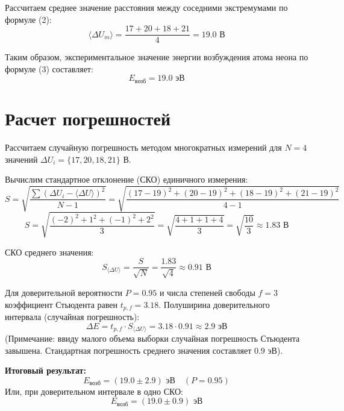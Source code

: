 \documentclass[a4paper,12pt]{article}
\begin{document}
\noindent Рассчитаем среднее значение расстояния между соседними экстремумами по формуле (2):
\begin{equation*}
\langle \Delta U_m \rangle = \frac{17 + 20 + 18 + 21}{4} = 19.0 \text{ В}
\end{equation*}

\noindent Таким образом, экспериментальное значение энергии возбуждения атома неона по формуле (3) составляет:
\begin{equation*}
E_{\text{возб}} = 19.0 \text{ эВ}
\end{equation*}

\section{Расчет погрешностей}

Рассчитаем случайную погрешность методом многократных измерений для $N = 4$ значений $\Delta U_i = \{17, 20, 18, 21\}$ В.

\noindent Вычислим стандартное отклонение (СКО) единичного измерения:
\begin{equation*}
S = \sqrt{\frac{\sum (\Delta U_i - \langle \Delta U \rangle)^2}{N-1}} = \sqrt{\frac{(17-19)^2 + (20-19)^2 + (18-19)^2 + (21-19)^2}{4-1}}
\end{equation*}
\begin{equation*}
S = \sqrt{\frac{(-2)^2 + 1^2 + (-1)^2 + 2^2}{3}} = \sqrt{\frac{4 + 1 + 1 + 4}{3}} = \sqrt{\frac{10}{3}} \approx 1.83 \text{ В}
\end{equation*}

\noindent СКО среднего значения:
\begin{equation*}
S_{\langle \Delta U \rangle} = \frac{S}{\sqrt{N}} = \frac{1.83}{\sqrt{4}} \approx 0.91 \text{ В}
\end{equation*}

\noindent Для доверительной вероятности $P = 0.95$ и числа степеней свободы $f = 3$ коэффициент Стьюдента равен $t_{p, f} = 3.18$.
Полуширина доверительного интервала (случайная погрешность):
\begin{equation*}
\Delta E = t_{p, f} \cdot S_{\langle \Delta U \rangle} = 3.18 \cdot 0.91 \approx 2.9 \text{ эВ}
\end{equation*}
\noindent (Примечание: ввиду малого объема выборки случайная погрешность Стьюдента завышена. Стандартная погрешность среднего значения составляет $0.9$ эВ).

\medskip
\noindent \textbf{Итоговый результат:}
\begin{equation*}
E_{\text{возб}} = (19.0 \pm 2.9) \text{ эВ} \quad (P = 0.95)
\end{equation*}
Или, при доверительном интервале в одно СКО:
\begin{equation*}
E_{\text{возб}} = (19.0 \pm 0.9) \text{ эВ}
\end{equation*}
\end{document}

